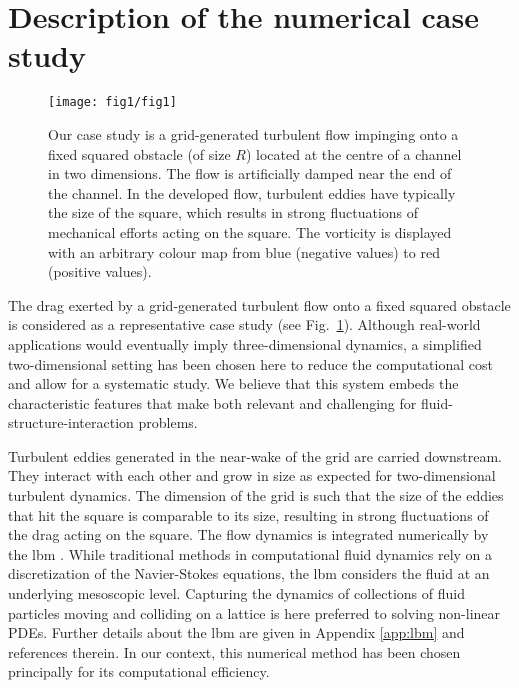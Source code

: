\section{Description of the numerical case study}
\label{sec:test_flow}

\begin{figure}
	\centering
	\texttt{[image: fig1/fig1]}
	\caption{Our case study is a grid-generated turbulent flow impinging onto a fixed squared obstacle (of size $R$) located at the centre of a channel in two dimensions. The flow is artificially damped near the end of the channel. In the developed flow, turbulent eddies have typically the size of the square, which results in strong fluctuations of mechanical efforts acting on the square. The vorticity is displayed with an arbitrary colour map from blue (negative values) to red (positive values).}
	\label{fig:illustr_ecoulement}
\end{figure}

%
The drag exerted by a grid-generated turbulent flow onto a fixed squared obstacle is considered as a representative case study (see Fig.~\ref{fig:illustr_ecoulement}). 
%
Although real-world applications would eventually imply three-dimensional dynamics, a simplified two-dimensional setting has been chosen here to reduce the computational cost and allow for a systematic study. 
% 
We believe that this system embeds the characteristic features that make
 both relevant and challenging for fluid-structure-interaction problems. 

Turbulent eddies generated in the near-wake of the grid are carried downstream.
They interact with each other and grow in size as expected for two-dimensional turbulent dynamics. 
The dimension of the grid is such that the size of the eddies that hit the square is comparable to its size, resulting in strong fluctuations of the drag acting on the square. 
%
The flow dynamics is integrated numerically by the \ac{lbm} . 
While traditional methods in computational fluid dynamics rely on a discretization of the Navier-Stokes equations, the \ac{lbm} considers the fluid at an underlying  mesoscopic level.
Capturing the dynamics of collections of fluid particles moving and colliding on a lattice is here preferred to solving non-linear PDEs. 
Further details about the \ac{lbm} are given in Appendix \ref{app:lbm} and references therein.
In our context, this numerical method has been chosen principally for its computational efficiency. 


